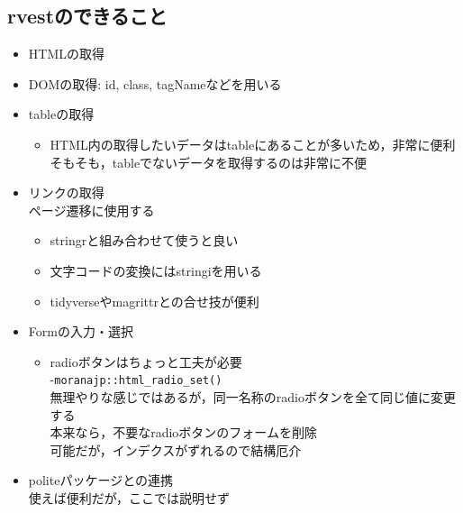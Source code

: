 \documentclass[
]{article}
\providecommand{\tightlist}{%
  \setlength{\itemsep}{0pt}\setlength{\parskip}{0pt}}
\begin{document}
\hypertarget{rvestux306eux3067ux304dux308bux3053ux3068}{%
\subsection{rvestのできること}\label{rvestux306eux3067ux304dux308bux3053ux3068}}

\begin{itemize}
\tightlist
\item
  HTMLの取得\\
\item
  DOMの取得: id, class, tagNameなどを用いる\\
\item
  tableの取得

  \begin{itemize}
  \tightlist
  \item
    HTML内の取得したいデータはtableにあることが多いため，非常に便利\\
    そもそも，tableでないデータを取得するのは非常に不便\\
  \end{itemize}
\item
  リンクの取得\\
  ページ遷移に使用する

  \begin{itemize}
  \tightlist
  \item
    stringrと組み合わせて使うと良い\\
  \item
    文字コードの変換にはstringiを用いる\\
  \item
    tidyverseやmagrittrとの合せ技が便利\\
  \end{itemize}
\item
  Formの入力・選択

  \begin{itemize}
  \tightlist
  \item
    radioボタンはちょっと工夫が必要\\
    -\texttt{moranajp::html\_radio\_set()}\\
    無理やりな感じではあるが，同一名称のradioボタンを全て同じ値に変更する\\
    本来なら，不要なradioボタンのフォームを削除\\
    可能だが，インデクスがずれるので結構厄介\\
  \end{itemize}
\item
  politeパッケージとの連携\\
  使えば便利だが，ここでは説明せず
\end{itemize}
\end{document}
